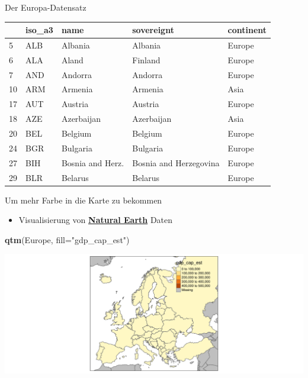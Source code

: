 \documentclass[ignorenonframetext,]{beamer}
\newenvironment{Shaded}{\begin{snugshade}}{\end{snugshade}}
\newcommand{\KeywordTok}[1]{\textcolor[rgb]{0.13,0.29,0.53}{\textbf{#1}}}
\newcommand{\DataTypeTok}[1]{\textcolor[rgb]{0.13,0.29,0.53}{#1}}
\newcommand{\StringTok}[1]{\textcolor[rgb]{0.31,0.60,0.02}{#1}}
\newcommand{\NormalTok}[1]{#1}
\providecommand{\tightlist}{%
  \setlength{\itemsep}{0pt}\setlength{\parskip}{0pt}}
\begin{document}
\begin{frame}{Der Europa-Datensatz}

\begin{longtable}[]{@{}lllll@{}}
\toprule
& iso\_a3 & name & sovereignt & continent\tabularnewline
\midrule
\endhead
5 & ALB & Albania & Albania & Europe\tabularnewline
6 & ALA & Aland & Finland & Europe\tabularnewline
7 & AND & Andorra & Andorra & Europe\tabularnewline
10 & ARM & Armenia & Armenia & Asia\tabularnewline
17 & AUT & Austria & Austria & Europe\tabularnewline
18 & AZE & Azerbaijan & Azerbaijan & Asia\tabularnewline
20 & BEL & Belgium & Belgium & Europe\tabularnewline
24 & BGR & Bulgaria & Bulgaria & Europe\tabularnewline
27 & BIH & Bosnia and Herz. & Bosnia and Herzegovina &
Europe\tabularnewline
29 & BLR & Belarus & Belarus & Europe\tabularnewline
\bottomrule
\end{longtable}

\end{frame}

\begin{frame}[fragile]{Um mehr Farbe in die Karte zu bekommen}

\begin{itemize}
\tightlist
\item
  Visualisierung von
  \href{http://www.naturalearthdata.com/}{\textbf{Natural Earth}} Daten
\end{itemize}

\begin{Shaded}
\begin{Highlighting}[]
\KeywordTok{qtm}\NormalTok{(Europe, }\DataTypeTok{fill=}\StringTok{"gdp_cap_est"}\NormalTok{)}
\end{Highlighting}
\end{Shaded}

\includegraphics{tmap_files/figure-beamer/unnamed-chunk-8-1.pdf}

\end{frame}
\end{document}
